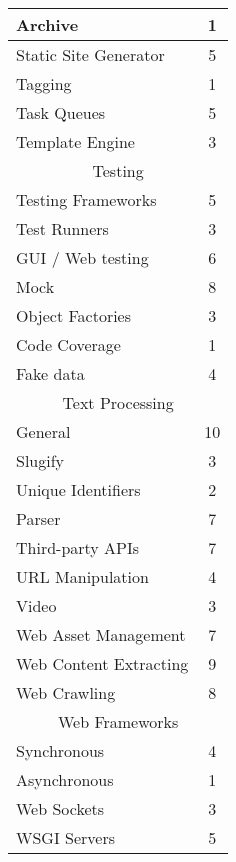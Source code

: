 \begin{longtable} {|l|c|}
    Archive & 1\\
    \hline
    Static Site Generator & 5\\
    \hline
    Tagging & 1\\
    \hline
    Task Queues & 5\\
    \hline
    Template Engine & 3\\
    \hline
    \multicolumn{2}{|c|}{Testing}\\
    \hline
    Testing Frameworks & 5\\
    Test Runners & 3\\
    GUI / Web testing & 6\\
    Mock & 8\\
    Object Factories & 3\\
    Code Coverage & 1\\
    Fake data & 4\\
    \hline
    \multicolumn{2}{|c|}{Text Processing}\\
    \hline
    General & 10\\
    Slugify & 3\\
    Unique Identifiers & 2\\
    Parser & 7\\
    \hline
    Third-party APIs & 7\\
    \hline
    URL Manipulation & 4\\
    \hline
    Video & 3\\
    \hline
    Web Asset Management & 7\\
    \hline
    Web Content Extracting & 9\\
    \hline
    Web Crawling & 8\\
    \hline
    \multicolumn{2}{|c|}{Web Frameworks}\\
    \hline
    Synchronous & 4\\
    Asynchronous & 1\\
    \hline
    Web Sockets & 3\\
    \hline
    WSGI Servers & 5\\
    \hline
\end{longtable}

